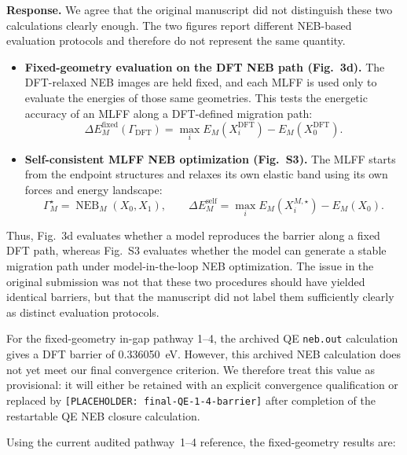 \documentclass[11pt,a4paper]{article}
\begin{document}
\noindent\textbf{Response.}
We agree that the original manuscript did not distinguish these two calculations clearly enough. The two figures report different NEB-based evaluation protocols and therefore do not represent the same quantity.

\begin{itemize}
    \item \textbf{Fixed-geometry evaluation on the DFT NEB path (Fig.~3d).}
    The DFT-relaxed NEB images are held fixed, and each MLFF is used only to evaluate the energies of those same geometries. This tests the energetic accuracy of an MLFF along a DFT-defined migration path:
    \begin{equation}
    \Delta E^{\mathrm{fixed}}_M(\Gamma_{\mathrm{DFT}})
    =
    \max_i E_M(X_i^{\mathrm{DFT}})
    -
    E_M(X_0^{\mathrm{DFT}}).
    \end{equation}

    \item \textbf{Self-consistent MLFF NEB optimization (Fig.~S3).}
    The MLFF starts from the endpoint structures and relaxes its own elastic band using its own forces and energy landscape:
    \begin{equation}
    \Gamma_M^\star = \operatorname{NEB}_M(X_0,X_1),
    \qquad
    \Delta E^{\mathrm{self}}_M
    =
    \max_i E_M(X_i^{M,\star})
    -
    E_M(X_0).
    \end{equation}
\end{itemize}

Thus, Fig.~3d evaluates whether a model reproduces the barrier along a fixed DFT path, whereas Fig.~S3 evaluates whether the model can generate a stable migration path under model-in-the-loop NEB optimization. The issue in the original submission was not that these two procedures should have yielded identical barriers, but that the manuscript did not label them sufficiently clearly as distinct evaluation protocols.

For the fixed-geometry in-gap pathway 1--4, the archived QE \texttt{neb.out} calculation gives a DFT barrier of 0.336050~eV. However, this archived NEB calculation does not yet meet our final convergence criterion. We therefore treat this value as provisional: it will either be retained with an explicit convergence qualification or replaced by \texttt{[PLACEHOLDER: final-QE-1-4-barrier]} after completion of the restartable QE NEB closure calculation.

Using the current audited pathway~1--4 reference, the fixed-geometry results are:
\end{document}
